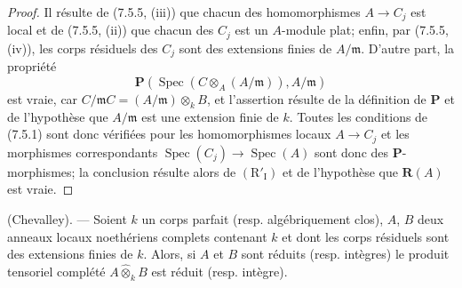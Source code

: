 \begin{proof}
Il résulte de (7.5.5, (iii)) que chacun des homomorphismes $A\to C_j$ est local
et de (7.5.5, (ii)) que chacun des $C_j$ est un $A$-module plat; enfin, par
(7.5.5, (iv)), les corps résiduels des $C_j$ sont des extensions finies de
$A/\mathfrak m$. D'autre part, la propriété
\[
\boldsymbol P(\operatorname{Spec}(C\otimes_A(A/\mathfrak m)),A/\mathfrak m)
\]
est vraie, car $C/\mathfrak mC=(A/\mathfrak m)\otimes_kB$, et l'assertion
résulte de la définition de $\boldsymbol P$ et de l'hypothèse que
$A/\mathfrak m$ est une extension finie de $k$. Toutes les conditions de
(7.5.1) sont donc vérifiées pour les homomorphismes locaux $A\to C_j$ et les
morphismes correspondants
$\operatorname{Spec}(C_j)\to\operatorname{Spec}(A)$ sont donc des
$\boldsymbol P$-morphismes; la conclusion résulte alors de
$(\mathrm R'_{\mathrm I})$ et de l'hypothèse que $\boldsymbol R(A)$ est vraie.
\end{proof}

\begin{corollary}[7.5.7]
\label{IV.2.s7.5.7-fr}
(Chevalley). --- Soient $k$ un corps parfait (resp. algébriquement clos), $A$,
$B$ deux anneaux locaux noethériens complets contenant $k$ et dont les corps
résiduels sont des extensions finies de $k$. Alors, si $A$ et $B$ sont réduits
(resp. intègres) le produit tensoriel complété $A\widehat\otimes_k B$ est
réduit (resp. intègre).
\end{corollary}

